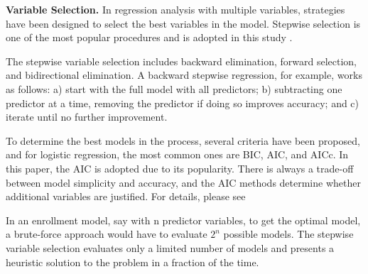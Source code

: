 \documentclass[12pt,english]{report}
\begin{document}
\vspace{0.15in}
\noindent \textbf{Variable Selection. }  In regression analysis with multiple variables, 
strategies have been designed to select the best variables in the model. Stepwise selection is one 
of the most popular procedures and is adopted in this study \citep{konishi2008information}.

The stepwise variable selection includes backward elimination, forward selection, and bidirectional elimination. A backward stepwise regression, for example, works as follows: a) start with the full model with all predictors; b) subtracting one predictor at a time, removing the predictor if doing so improves accuracy; and c) iterate until no further improvement. 


To determine the best models in the process, several criteria have been proposed, and for logistic regression, the most common ones are BIC, AIC, and AICc. In this paper, the AIC is adopted due to its popularity.  There is always a trade-off between model simplicity and accuracy, and the AIC methods determine whether additional variables are justified. For details, please see \citep{wagenmakers2004aic}
     
In an enrollment model, say with n predictor variables, to get the optimal model, a brute-force approach would have to evaluate $2^{n}$ possible models. The stepwise variable selection evaluates only a limited number of models and presents a heuristic solution to the problem in a fraction of the time.  
\end{document}

